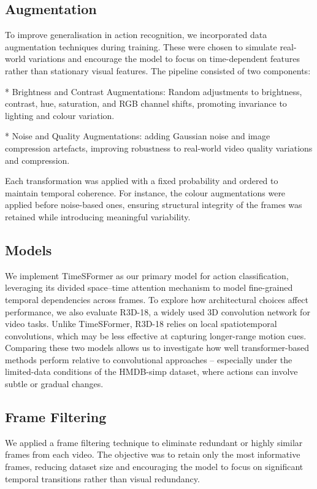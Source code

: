 \documentclass[conference]{IEEEtran}
\begin{document}
\subsection{Augmentation}
To improve generalisation in action recognition, we incorporated data augmentation techniques during training. These were chosen to simulate real-world variations and encourage the model to focus on time-dependent features rather than stationary visual features. The pipeline consisted of two components: 

* Brightness and Contrast Augmentations: Random adjustments to brightness, contrast, hue, saturation, and RGB channel shifts, promoting invariance to lighting and colour variation. 

* Noise and Quality Augmentations: adding Gaussian noise and image compression artefacts, improving robustness to real-world video quality variations and compression. 

Each transformation was applied with a fixed probability and ordered to maintain temporal coherence. For instance, the colour augmentations were applied before noise-based ones, ensuring structural integrity of the frames was retained while introducing meaningful variability. 

\subsection{Models}
We implement TimeSFormer as our primary model for action classification, leveraging its divided space–time attention mechanism to model fine-grained temporal dependencies across frames. To explore how architectural choices affect performance, we also evaluate R3D-18, a widely used 3D convolution network for video tasks. Unlike TimeSFormer, R3D-18 relies on local spatiotemporal convolutions, which may be less effective at capturing longer-range motion cues. Comparing these two models allows us to investigate how well transformer-based methods perform relative to convolutional approaches – especially under the limited-data conditions of the HMDB-simp dataset, where actions can involve subtle or gradual changes. 

\subsection{Frame Filtering}
We applied a frame filtering technique to eliminate redundant or highly similar frames from each video. The objective was to retain only the most informative frames, reducing dataset size and encouraging the model to focus on significant temporal transitions rather than visual redundancy. 
\end{document}
